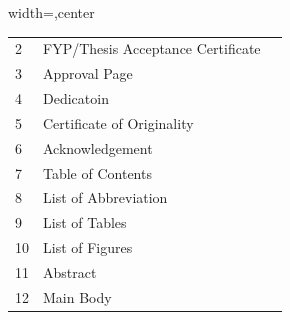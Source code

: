 \begin{table}[!ht]
\begin{adjustbox}{width=\linewidth,center}
\begin{tabular}{p{0.6cm}p{9cm}p{0.6cm}}
2              & FYP/Thesis Acceptance   Certificate                                                                                 &  \\
3              & Approval Page                                                                                                   &  \\
4              & Dedicatoin                                                                                                      &  \\
5              & Certificate of   Originality                                                                                    &  \\
6              & Acknowledgement                                                                                                 &  \\
7              & Table of Contents                                                                                               &  \\
8              & List of Abbreviation                                                                                            &  \\
9              & List of Tables                                                                                                  &  \\
10             & List of Figures                                                                                                 &  \\
11             & Abstract                                                                                                        &  \\
12             & Main Body                                                                                                       &  \\

\end{tabular}
\end{adjustbox}
\end{table}

